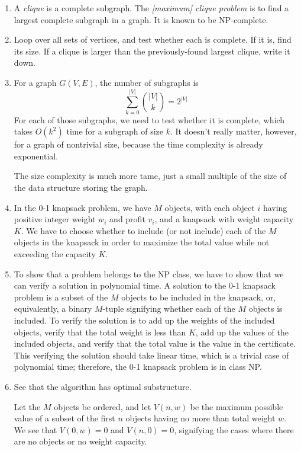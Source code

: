 \begin{enumerate}[label=\alph*.]
	\item A {\it clique} is a complete subgraph.  The {\it [maximum] clique problem} is to find a largest complete subgraph in a graph.  It is known to be NP-complete.  
	\item Loop over all sets of vertices, and test whether each is complete.  If it is, find its size.  If a clique is larger than the previously-found largest clique, write it down.  
	\item For a graph $G(V,E)$, the number of subgraphs is
	$$\sum_{k=0}^{|V|} {|V| \choose k} = 2^{|V|}$$
	For each of those subgraphs, we need to test whether it is complete, which takes $O(k^2)$ time for a subgraph of size $k$.  It doesn't really matter, however, for a graph of nontrivial size, because the time complexity is already exponential. 
	
	The size complexity is much more tame, just a small multiple of the size of the data structure storing the graph.  
	\item In the 0-1 knapsack problem, we have $M$ objects, with each object $i$ having positive integer weight $w_i$ and profit $v_i$, and a knapsack with weight capacity $K$.  We have to choose whether to include (or not include) each of the $M$ objects in the knapsack in order to maximize the total value while not exceeding the capacity $K$.  
	\item To show that a problem belongs to the NP class, we have to show that we can verify a solution in polynomial time.  A solution to the 0-1 knapsack problem is a subset of the $M$ objects to be included in the knapsack, or, equivalently, a binary $M$-tuple signifying whether each of the $M$ objects is included.  To verify the solution is to add up the weights of the included objects, verify that the total weight is less than $K$, add up the values of the included objects, and verify that the total value is the value in the certificate.  This verifying the solution should take linear time, which is a trivial case of polynomial time; therefore, the 0-1 knapsack problem is in class NP.  
	 \item See that the algorithm has optimal substructure.  
	 
	 Let the $M$ objects be ordered, and let $V(n,w)$ be the maximum possible value of a subset of the first $n$ objects having no more than total weight $w$.  We see that $V(0,w) = 0$ and $V(n,0) = 0$, signifying the cases where there are no objects or no weight capacity.  
	 

\end{enumerate}
